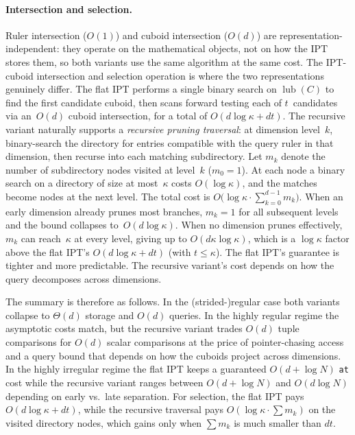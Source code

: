 \documentclass[manuscript,screen,review]{acmart}
\theoremstyle{definition}
\theoremstyle{plain}
\begin{document}
\paragraph{Intersection and selection.}
Ruler intersection ($O(1)$) and cuboid intersection ($O(d)$) are
representation-independent: they operate on the mathematical objects,
not on how the IPT stores them, so both variants use the same algorithm
at the same cost.
The IPT-cuboid intersection and selection operation
is where the two representations genuinely differ.
The flat IPT performs a single binary search on $\operatorname{lub}(C)$
to find the first candidate cuboid, then scans forward testing each of
$t$~candidates via an~$O(d)$ cuboid intersection, for a total of
$O(d\log\kappa+dt)$.
The recursive variant naturally supports a \emph{recursive pruning
traversal}: at dimension level~$k$, binary-search the directory for
entries compatible with the query ruler in that dimension, then recurse
into each matching subdirectory.
Let $m_k$ denote the number of subdirectory nodes visited at level~$k$
($m_0=1$). At each node a binary search on a directory of size
at most~$\kappa$ costs $O(\log\kappa)$, and the matches become nodes
at the next level.
The total cost is
$O\!\bigl(\log\kappa\cdot\sum_{k=0}^{d-1}m_k\bigr)$.
When an early dimension already prunes most branches,
$m_k=1$ for all subsequent levels and the bound collapses
to~$O(d\log\kappa)$.
When no dimension prunes effectively, $m_k$ can reach~$\kappa$
at every level, giving up to $O(d\kappa\log\kappa)$,
which is a $\log\kappa$ factor above the flat IPT's
$O(d\log\kappa+dt)$ (with $t\le\kappa$).
The flat IPT's guarantee is tighter and more predictable.
The recursive variant's cost depends on how the query
decomposes across dimensions.

\medskip
\noindent
The summary is therefore as follows. In the (strided-)regular case
both variants collapse to $\Theta(d)$ storage and $O(d)$ queries. In
the highly regular regime the asymptotic costs match, but the
recursive variant trades $O(d)$ tuple comparisons for $O(d)$ scalar
comparisons at the price of pointer-chasing access and a query bound
that depends on how the cuboids project across dimensions. In the
highly irregular regime the flat IPT keeps a guaranteed $O(d+\log N)$
\texttt{at} cost while the recursive variant ranges between
$O(d+\log N)$ and $O(d\log N)$ depending on early vs.\ late
separation. For selection, the flat IPT pays
$O(d\log\kappa+dt)$, while the recursive traversal pays
$O(\log\kappa\cdot\sum m_k)$ on the visited directory nodes, which
gains only when $\sum m_k$ is much smaller than $dt$.
\end{document}
